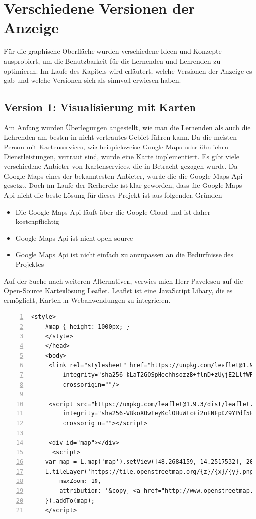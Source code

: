\section{Verschiedene Versionen der Anzeige}
Für die graphische Oberfläche wurden verschiedene Ideen und Konzepte ausprobiert, um die Benutzbarkeit für die Lernenden und Lehrenden zu optimieren.
Im Laufe des Kapitels wird erläutert, welche Versionen der Anzeige es gab und welche Versionen sich als sinnvoll erwiesen haben.

\subsection{Version 1: Visualisierung mit Karten}
Am Anfang wurden Überlegungen angestellt, wie man die Lernenden als auch die Lehrenden am besten in nicht vertrautes Gebiet führen kann.
Da die meisten Person mit Kartenservices, wie beispielsweise Google Maps oder ähnlichen Dienstleistungen, vertraut sind, wurde eine Karte implementiert.
Es gibt viele verschiedene Anbieter von Kartenservices, die in Betracht gezogen wurde. 
Da Google Maps eines der bekanntesten Anbieter, wurde die die Google Maps Api gesetzt. 
Doch im Laufe der Recherche ist klar geworden, dass die Google Maps Api nicht die beste Lösung für dieses Projekt ist  aus folgenden Gründen
\begin{itemize}
    \item Die Google Maps Api läuft über die Google Cloud und ist daher kostenpflichtig
    \item Google Maps Api ist nicht open-source
    \item Google Maps Api ist nicht einfach zu anzupassen an die Bedürfnisse des Projektes 
\end{itemize}

Auf der Suche nach weiteren Alternativen, verwies mich Herr Pavelescu auf die Open-Source Kartenlösung Leaflet.
Leaflet ist eine JavaScript Libary, die es ermöglicht, Karten in Webanwendungen zu integrieren. 
\cite{Agafonkin}

\pagebreak

\begin{lstlisting}[numbers=left]
    <style>
    #map { height: 1000px; }
    </style>
    </head>
    <body>
     <link rel="stylesheet" href="https://unpkg.com/leaflet@1.9.3/dist/leaflet.css"
         integrity="sha256-kLaT2GOSpHechhsozzB+flnD+zUyjE2LlfWPgU04xyI="
         crossorigin=""/>
    
     <script src="https://unpkg.com/leaflet@1.9.3/dist/leaflet.js"
         integrity="sha256-WBkoXOwTeyKclOHuWtc+i2uENFpDZ9YPdf5Hf+D7ewM="
         crossorigin=""></script>
    
     <div id="map"></div>
      <script>
    var map = L.map('map').setView([48.2684159, 14.2517532], 20);
    L.tileLayer('https://tile.openstreetmap.org/{z}/{x}/{y}.png', {
        maxZoom: 19,
        attribution: '&copy; <a href="http://www.openstreetmap.org/copyright">OpenStreetMap</a>'
    }).addTo(map);
    </script> 
\end{lstlisting}

